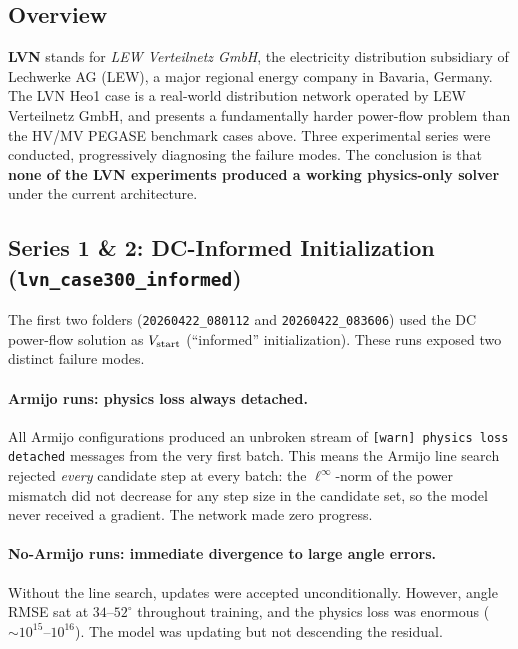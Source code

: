 \documentclass{article}
\begin{document}
\subsection{Overview}

\textbf{LVN} stands for \textit{LEW Verteilnetz GmbH}, the electricity
distribution subsidiary of Lechwerke AG (LEW), a major regional energy company
in Bavaria, Germany.  The LVN Heo1 case is a real-world distribution network
operated by LEW Verteilnetz GmbH, and presents a fundamentally harder
power-flow problem than the HV/MV PEGASE benchmark cases above.  Three
experimental series were conducted, progressively diagnosing the failure modes.
The conclusion is that \textbf{none of the LVN experiments produced a working
physics-only solver} under the current architecture.

\subsection{Series 1 \& 2: DC-Informed Initialization
  (\texttt{lvn\_case300\_informed})}

The first two folders (\texttt{20260422\_080112} and
\texttt{20260422\_083606}) used the DC power-flow solution as $V_{\rm
start}$ (``informed'' initialization).  These runs exposed two distinct
failure modes.

\paragraph{Armijo runs: physics loss always detached.}
All Armijo configurations produced an unbroken stream of
\texttt{[warn] physics loss detached} messages from the very first batch.
This means the Armijo line search rejected \emph{every} candidate step at
every batch: the $\ell^\infty$-norm of the power mismatch did not decrease
for any step size in the candidate set, so the model never received a
gradient.  The network made zero progress.

\paragraph{No-Armijo runs: immediate divergence to large angle errors.}
Without the line search, updates were accepted unconditionally.  However,
angle RMSE sat at $34$--$52^\circ$ throughout training, and the physics
loss was enormous ($\sim10^{15}$--$10^{16}$).  The model was updating but
not descending the residual.
\end{document}
